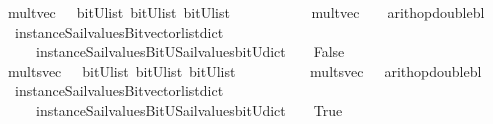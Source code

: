 \begin{isabellebody}
\isanewline
{}\isamarkupfalse%
\ mult{\isacharunderscore}vec\ \ {\isacharcolon}{\isacharcolon}\ {\isachardoublequoteopen}{\isacharparenleft}bitU{\isacharparenright}list\ {\isasymRightarrow}{\isacharparenleft}bitU{\isacharparenright}list\ {\isasymRightarrow}{\isacharparenleft}bitU{\isacharparenright}list\ {\isachardoublequoteclose}\ \ \ \ \isanewline
\ \ \ \ \ {\isachardoublequoteopen}\ mult{\isacharunderscore}vec\ \ {\isacharequal}\ {\isacharparenleft}\ arith{\isacharunderscore}op{\isacharunderscore}double{\isacharunderscore}bl\ \isanewline
\ \ {\isacharparenleft}instance{\isacharunderscore}Sail{}{\isacharunderscore}values{\isacharunderscore}Bitvector{\isacharunderscore}list{\isacharunderscore}dict\isanewline
\ \ \ \ \ instance{\isacharunderscore}Sail{}{\isacharunderscore}values{\isacharunderscore}BitU{\isacharunderscore}Sail{}{\isacharunderscore}values{\isacharunderscore}bitU{\isacharunderscore}dict{\isacharparenright}\ {\isacharparenleft}\ {\isacharasterisk}\ {\isacharparenright}\ False\ {\isacharparenright}{\isachardoublequoteclose}\isanewline
\isanewline
{}\isamarkupfalse%
\ mults{\isacharunderscore}vec\ \ {\isacharcolon}{\isacharcolon}\ {\isachardoublequoteopen}{\isacharparenleft}bitU{\isacharparenright}list\ {\isasymRightarrow}{\isacharparenleft}bitU{\isacharparenright}list\ {\isasymRightarrow}{\isacharparenleft}bitU{\isacharparenright}list\ {\isachardoublequoteclose}\ \ \ \isanewline
\ \ \ \ \ {\isachardoublequoteopen}\ mults{\isacharunderscore}vec\ {\isacharequal}\ {\isacharparenleft}\ arith{\isacharunderscore}op{\isacharunderscore}double{\isacharunderscore}bl\ \isanewline
\ \ {\isacharparenleft}instance{\isacharunderscore}Sail{}{\isacharunderscore}values{\isacharunderscore}Bitvector{\isacharunderscore}list{\isacharunderscore}dict\isanewline
\ \ \ \ \ instance{\isacharunderscore}Sail{}{\isacharunderscore}values{\isacharunderscore}BitU{\isacharunderscore}Sail{}{\isacharunderscore}values{\isacharunderscore}bitU{\isacharunderscore}dict{\isacharparenright}\ {\isacharparenleft}\ {\isacharasterisk}\ {\isacharparenright}\ True\ {\isacharparenright}{\isachardoublequoteclose}\isanewline
\isanewline
\isanewline
%
\isanewline
%
\end{isabellebody}
